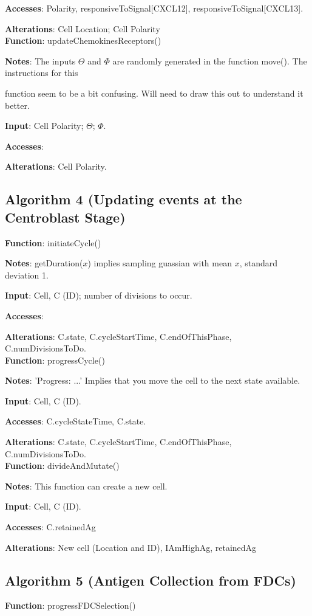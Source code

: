 \documentclass[english]{article}
\begin{document}
\textbf{Accesses}: Polarity, responsiveToSignal[CXCL12], responsiveToSignal[CXCL13].

\textbf{Alterations}: Cell Location; Cell Polarity
\\
\textbf{Function}: updateChemokinesReceptors() 

\textbf{Notes}: The inputs $\Theta$ and $\Phi$ are randomly generated in the function move(). The instructions for this 

function seem to be a bit confusing. Will need to draw this out to understand it better. 


\textbf{Input}: Cell Polarity; $\Theta$; $\Phi$.  

\textbf{Accesses}: 

\textbf{Alterations}: Cell Polarity. 


\subsection{Algorithm 4 (Updating events at the Centroblast Stage)}	

\textbf{Function}: initiateCycle()

\textbf{Notes}: getDuration($x$) implies sampling guassian with mean $x$, standard deviation 1.

\textbf{Input}: Cell, C (ID); number of divisions to occur.

\textbf{Accesses}:

\textbf{Alterations}: C.state, C.cycleStartTime, C.endOfThisPhase, C.numDivisionsToDo. 
\\
\textbf{Function}: progressCycle()

\textbf{Notes}: 'Progress: ...' Implies that you move the cell to the next state available. 

\textbf{Input}: Cell, C (ID). 

\textbf{Accesses}: C.cycleStateTime, C.state. 

\textbf{Alterations}: C.state, C.cycleStartTime, C.endOfThisPhase, C.numDivisionsToDo. 
\\
\textbf{Function}: divideAndMutate()

\textbf{Notes}: This function can create a new cell. 

\textbf{Input}: Cell, C (ID). 

\textbf{Accesses}: C.retainedAg

\textbf{Alterations}: New cell (Location and ID), IAmHighAg, retainedAg

\subsection{Algorithm 5 (Antigen Collection from FDCs)}
\textbf{Function}: progressFDCSelection()
\end{document}
